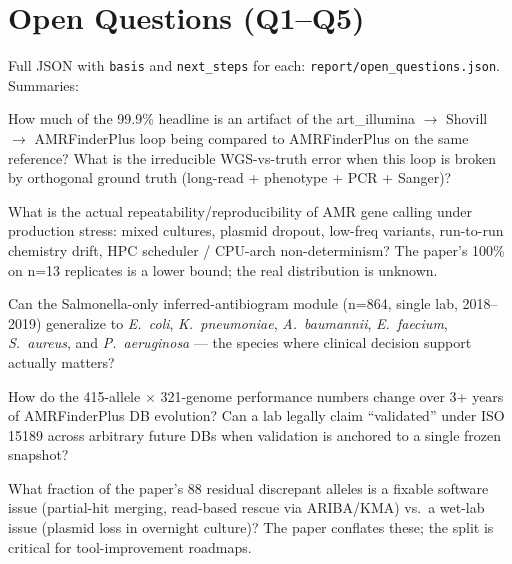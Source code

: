 \documentclass[11pt,a4paper]{article}
\begin{document}
\begin{center}
\end{center}

\section{Open Questions (Q1--Q5)}

Full JSON with \texttt{basis} and \texttt{next\_steps} for each: \texttt{report/open\_questions.json}. Summaries:

\begin{description}[leftmargin=1.5em, style=nextline]
  \item[\textbf{Q1: Self-consistency loop.}] How much of the 99.9\% headline is an artifact of the art\_illumina $\to$ Shovill $\to$ AMRFinderPlus loop being compared to AMRFinderPlus on the same reference? What is the irreducible WGS-vs-truth error when this loop is broken by orthogonal ground truth (long-read + phenotype + PCR + Sanger)?
  \item[\textbf{Q2: Real precision distribution.}] What is the actual repeatability/reproducibility of AMR gene calling under production stress: mixed cultures, plasmid dropout, low-freq variants, run-to-run chemistry drift, HPC scheduler / CPU-arch non-determinism? The paper's 100\% on n=13 replicates is a lower bound; the real distribution is unknown.
  \item[\textbf{Q3: Non-Salmonella phenotype generalization.}] Can the Salmonella-only inferred-antibiogram module (n=864, single lab, 2018--2019) generalize to \emph{E.~coli}, \emph{K.~pneumoniae}, \emph{A.~baumannii}, \emph{E.~faecium}, \emph{S.~aureus}, and \emph{P.~aeruginosa} --- the species where clinical decision support actually matters?
  \item[\textbf{Q4: DB version drift.}] How do the 415-allele $\times$ 321-genome performance numbers change over 3+ years of AMRFinderPlus DB evolution? Can a lab legally claim ``validated'' under ISO 15189 across arbitrary future DBs when validation is anchored to a single frozen snapshot?
  \item[\textbf{Q5: Contig-break FN vs. plasmid-dropout FN.}] What fraction of the paper's 88 residual discrepant alleles is a fixable software issue (partial-hit merging, read-based rescue via ARIBA/KMA) vs.~a wet-lab issue (plasmid loss in overnight culture)? The paper conflates these; the split is critical for tool-improvement roadmaps.
\end{description}
\end{document}
